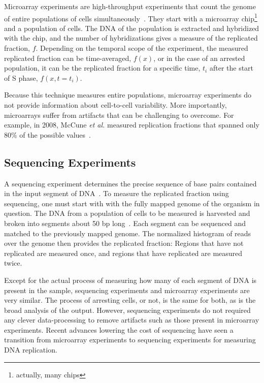 		Microarray experiments are high-throughput experiments that count the genome of entire populations of cells simultaneously~\cite{MicroarrayReview}.
		They start with a microarray chip\footnote{actually, many chips} and a population of cells.
		The DNA of the population is extracted and hybridized with the chip, and the number of hybridizations gives a measure of the replicated fraction, $f$.
		Depending on the temporal scope of the experiment, the measured replicated fraction can be time-averaged, $f(x)$, or in the case of an arrested population, it can be the replicated fraction for a specific time, $t_i$ after the start of S phase, $f(x,t=t_i)$.
		
		Because this technique measures entire populations, microarray experiments do not provide information about cell-to-cell variability.
		More importantly, microarrays suffer from artifacts that can be challenging to overcome.
		For example, in 2008, McCune \emph{et al.} measured replication fractions that spanned only 80\% of the possible values~\cite{McCuneMicroArray}.
		
		
		\subsection{Sequencing Experiments}
		\label{subsec:Sequencing}
		
		A sequencing experiment determines the precise sequence of base pairs contained in the input segment of DNA~\cite{SequencingReview}.
		To measure the replicated fraction using sequencing, one must start with with the fully mapped genome of the organism in question.
		The DNA from a population of cells to be measured is harvested and broken into segments about 50 bp long~\cite{StochasticTermination}.
		Each segment can be sequenced and matched to the previously mapped genome.
		The normalized histogram of reads over the genome then provides the replicated fraction:
		Regions that have not replicated are measured once, and regions that have replicated are measured twice.
		
		Except for the actual process of measuring how many of each segment of DNA is present in the sample, sequencing experiments and microarray experiments are very similar.
		The process of arresting cells, or not, is the same for both, as is the broad analysis of the output.
		However, sequencing experiments do not required any clever data-processing to remove artifacts such as those present in microarray experiments.
		Recent advances lowering the cost of sequencing have seen a transition from microarray experiments to sequencing experiments for measuring DNA replication.~\cite{EndOfMicroarray} 
		
